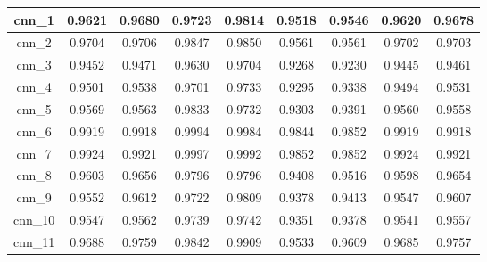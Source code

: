 \begin{table}[p]
\begin{tabular} {|c|c|c|c|c|c|c|c|c| }
        cnn\_1   & 0.9621                        & 0.9680                         & 0.9723                      & 0.9814                  & 0.9518 & 0.9546 & 0.9620 & 0.9678 \\ \hline
        cnn\_2   & 0.9704                        & 0.9706                         & 0.9847                      & 0.9850                  & 0.9561 & 0.9561 & 0.9702 & 0.9703 \\ \hline
        cnn\_3   & 0.9452                        & 0.9471                         & 0.9630                      & 0.9704                  & 0.9268 & 0.9230 & 0.9445 & 0.9461 \\ \hline
        cnn\_4   & 0.9501                        & 0.9538                         & 0.9701                      & 0.9733                  & 0.9295 & 0.9338 & 0.9494 & 0.9531 \\ \hline
        cnn\_5   & 0.9569                        & 0.9563                         & 0.9833                      & 0.9732                  & 0.9303 & 0.9391 & 0.9560 & 0.9558 \\ \hline
        cnn\_6   & 0.9919                        & 0.9918                         & 0.9994                      & 0.9984                  & 0.9844 & 0.9852 & 0.9919 & 0.9918 \\ \hline
        cnn\_7   & 0.9924                        & 0.9921                         & 0.9997                      & 0.9992                  & 0.9852 & 0.9852 & 0.9924 & 0.9921 \\ \hline
        cnn\_8   & 0.9603                        & 0.9656                         & 0.9796                      & 0.9796                  & 0.9408 & 0.9516 & 0.9598 & 0.9654 \\ \hline
        cnn\_9   & 0.9552                        & 0.9612                         & 0.9722                      & 0.9809                  & 0.9378 & 0.9413 & 0.9547 & 0.9607 \\ \hline
        cnn\_10  & 0.9547                        & 0.9562                         & 0.9739                      & 0.9742                  & 0.9351 & 0.9378 & 0.9541 & 0.9557 \\ \hline
        cnn\_11  & 0.9688                        & 0.9759                         & 0.9842                      & 0.9909                  & 0.9533 & 0.9609 & 0.9685 & 0.9757 \\ \hline
    \end{tabular}
\end{table}


